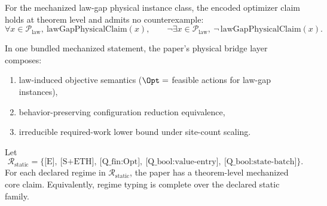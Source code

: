 \begin{proposition}\label{prop:law-instance-objective-bridge}
For the mechanized law-gap physical instance class, the encoded optimizer claim holds at theorem level and admits no counterexample:
\[
\forall x\in\mathcal{P}_{\mathrm{law}},\ \mathrm{lawGapPhysicalClaim}(x),
\qquad
\neg\exists x\in\mathcal{P}_{\mathrm{law}},\ \neg\,\mathrm{lawGapPhysicalClaim}(x).
\]
\end{proposition}

\begin{theorem}\label{thm:physical-bridge-bundle}
In one bundled mechanized statement, the paper's physical bridge layer composes:
\begin{enumerate}
\item law-induced objective semantics (\(\Opt=\) feasible actions for law-gap instances),
\item behavior-preserving configuration reduction equivalence,
\item irreducible required-work lower bound under site-count scaling.
\end{enumerate}
\end{theorem}

\begin{theorem}\label{thm:regime-coverage}
Let
\[
\mathcal{R}_{\mathrm{static}} =
\{\text{[E]},\ \text{[S+ETH]},\ \text{[Q\_fin:Opt]},\ \text{[Q\_bool:value-entry]},\ \text{[Q\_bool:state-batch]}\}.
\]
For each declared regime in $\mathcal{R}_{\mathrm{static}}$, the paper has a theorem-level mechanized core claim. Equivalently, regime typing is complete over the declared static family.
\end{theorem}

